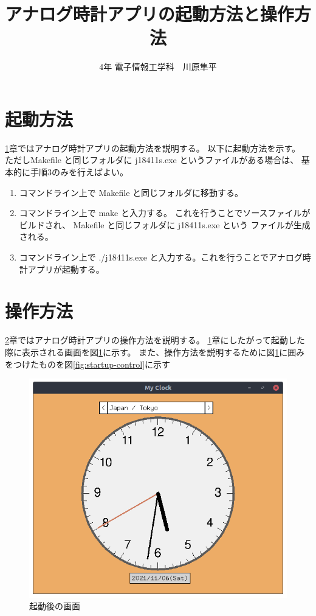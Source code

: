 \documentclass[a4paper,11pt]{jsarticle}
\begin{document}
\title{アナログ時計アプリの起動方法と操作方法}
\author{4年 電子情報工学科　川原隼平}
\date{}
\maketitle
  \section{起動方法}\label{sec:startup}
    \ref{sec:startup}章ではアナログ時計アプリの起動方法を説明する。
    以下に起動方法を示す。
    ただしMakefile と同じフォルダに j18411s.exe というファイルがある場合は、
    基本的に手順3のみを行えばよい。

    \begin{enumerate}
      \item コマンドライン上で Makefile と同じフォルダに移動する。
      \item コマンドライン上で make と入力する。
      これを行うことでソースファイルがビルドされ、 Makefile と同じフォルダに j18411s.exe という
      ファイルが生成される。
      \item コマンドライン上で ./j18411s.exe と入力する。これを行うことでアナログ時計アプリが起動する。
    \end{enumerate}

  \section{操作方法}\label{sec:control}
    \ref{sec:control}章ではアナログ時計アプリの操作方法を説明する。
    \ref{sec:startup}章にしたがって起動した際に表示される画面を図\ref{fig:startup}に示す。
    また、操作方法を説明するために図\ref{fig:startup}に囲みをつけたものを図\ref{fig:startup-control}に示す

    \begin{figure}[H]
      \centering
      \includegraphics[scale=0.3]{./src/startup.png}
      \caption{起動後の画面}
      \label{fig:startup}
    \end{figure}
\end{document}
